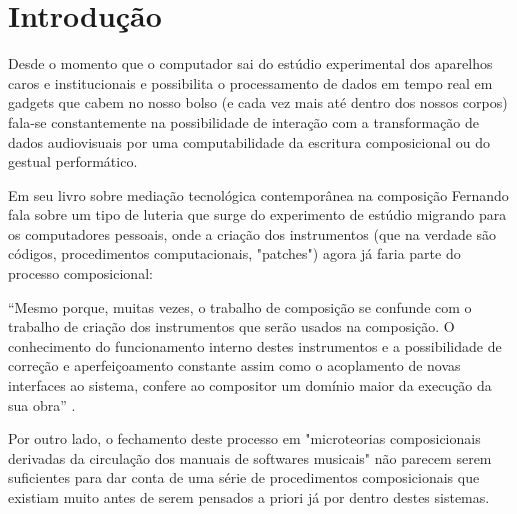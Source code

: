 \documentclass[
	12pt,				%
	openright,			%
	twoside,			%
	a4paper,			%
	english,			%
	french,				%
	spanish,			%
	brazil				%
	]{abntex2}
\begin{document}
\tableofcontents*
\cleardoublepage

%
%
%
%
%
%
%
\textual

\chapter*[Introdução]{Introdução}



Desde o momento que o computador sai do estúdio experimental dos aparelhos caros e institucionais e possibilita o processamento de dados em tempo real em gadgets que cabem no nosso bolso (e cada vez mais até dentro dos nossos corpos) fala-se constantemente na possibilidade de interação com a transformação de dados audiovisuais por uma computabilidade da escritura composicional ou do gestual performático. 

Em seu livro sobre mediação tecnológica contemporânea na composição Fernando  fala sobre um tipo de luteria que surge do experimento de estúdio migrando para os computadores pessoais, onde a criação dos instrumentos (que na verdade são códigos, procedimentos computacionais, "patches") agora já faria parte do processo composicional:


\begin{citacao}
“Mesmo porque, muitas vezes, o trabalho de composição se confunde com o trabalho de criação dos instrumentos que serão usados na composição. O conhecimento do funcionamento interno destes instrumentos e a possibilidade de correção e aperfeiçoamento constante assim como o acoplamento de novas interfaces ao sistema, confere ao compositor um domínio maior da execução da sua obra”  \cite[p. 209]{iazzetta2009musica}.
\end{citacao}

Por outro lado, o fechamento deste processo em "microteorias composicionais derivadas da circulação dos manuais de softwares musicais"\cite[p. 152]{iazzetta2009musica} não parecem serem suficientes para dar conta de uma série de procedimentos composicionais que existiam muito antes de serem pensados a priori já por dentro destes sistemas.
\end{document}
